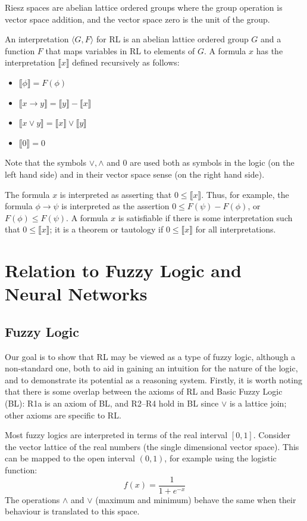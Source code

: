 \documentclass[journal,draftcls,onecolumn]{IEEEtran}
\theoremstyle{definition}
\newcommand{\interp}[1]{\llbracket #1 \rrbracket}
\begin{document}
Riesz spaces are abelian lattice ordered groups where the group
operation is vector space addition, and the vector space zero is the
unit of the group.

An interpretation $\langle G, F\rangle$ for RL is an abelian lattice
ordered group $G$ and a function $F$ that maps variables in RL to
elements of $G$. A formula $x$ has the interpretation $\interp{x}$
defined recursively as follows:
\begin{itemize}
\item $\interp{\phi} = F(\phi)$
\item $\interp{x \rightarrow y} = \interp{y} - \interp{x}$
\item $\interp{x \lor y} = \interp{x} \lor \interp{y}$
\item $\interp{0} = 0$
\end{itemize}
Note that the symbols $\lor, \land$ and $0$ are used both as symbols
in the logic (on the left hand side) and in their vector space sense
(on the right hand side).

The formula $x$ is interpreted as asserting that $0 \le
\interp{x}$. Thus, for example, the formula $\phi \rightarrow \psi$ is
interpreted as the assertion $0 \le F(\psi) - F(\phi)$, or $F(\phi)
\le F(\psi)$. A formula $x$ is satisfiable if there is some
interpretation such that $0 \le \interp{x}$; it is a theorem or
tautology if $0 \le \interp{x}$ for all interpretations.

\section{Relation to Fuzzy Logic and Neural Networks}

\subsection{Fuzzy Logic}

Our goal is to show that RL may be viewed as a type of fuzzy logic,
although a non-standard one, both to aid in gaining an intuition for
the nature of the logic, and to demonstrate its potential as a
reasoning system. Firstly, it is worth noting that there is some
overlap between the axioms of RL and Basic Fuzzy Logic (BL): R1a is an
axiom of BL, and R2--R4 hold in BL since $\lor$ is a lattice join;
other axioms are specific to RL.

Most fuzzy logics are interpreted in terms of the real interval
$[0,1]$. Consider the vector lattice of the real numbers (the
single dimensional vector space). This can be mapped to the open
interval $(0,1)$, for example using the logistic function:
$$f(x) = \frac{1}{1 + e^{-x}}$$
The operations $\land$ and $\lor$ (maximum and minimum) behave the
same when their behaviour is translated to this space.
\end{document}
